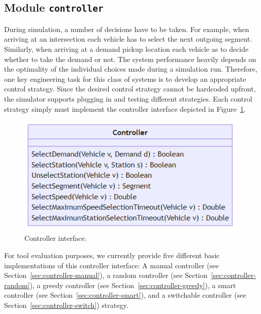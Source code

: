 \documentclass[10pt,twocolumn]{article}
\begin{document}
\subsection{Module \texttt{controller}}
\label{sec:controller-interface}


During simulation, a number of decisions have to be taken.
For example, when arriving at an intersection each vehicle has to select the next outgoing segment.
Similarly, when arriving at a demand pickup location each vehicle as to decide whether to take the demand or not.
The system performance heavily depends on the optimality of the individual choices made during a simulation run.
Therefore, one key engineering task for this class of systems is to develop an appropriate control strategy.
Since the desired control strategy cannot be hardcoded upfront, the simulator supports plugging in and testing different strategies.
Each control strategy simply must implement the controller interface depicted in Figure~\ref{fig:controller-interface}.

\begin{figure}[h!]
    \centering
    \includegraphics[scale=0.4]{../../diagrams/controller/classes-minimal.png}
    \caption{Controller interface.}
    \label{fig:controller-interface}
\end{figure}

For tool evaluation purposes, we currently provide five different basic implementations of this controller interface:
A manual controller (see Section~\ref{sec:controller-manual}), a random controller (see Section~\ref{sec:controller-random}), a greedy controller (see Section~\ref{sec:controller-greedy}), a smart controller (see Section~\ref{sec:controller-smart}), and a switchable controller (see Section~\ref{sec:controller-switch}) strategy.
\end{document}
